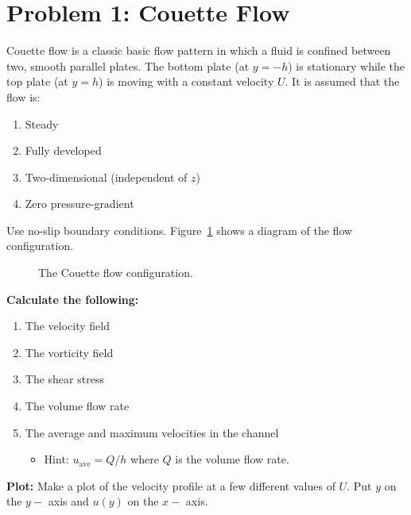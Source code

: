 \documentclass[11pt]{article}
\begin{document}
  \section{Problem 1:  Couette Flow}
    Couette flow is a classic basic flow pattern in which a fluid is confined between two, smooth parallel plates.  The
bottom plate (at $y=-h$) is stationary while the top plate (at $y=h$) is moving with a constant velocity $U$.  It is assumed
that the flow is:
    \begin{enumerate}
      \item Steady
      \item Fully developed
      \item Two-dimensional (independent of $z$)
      \item Zero pressure-gradient
    \end{enumerate}
    Use no-slip boundary conditions.  Figure~\ref{fig:couette} shows a diagram of the flow configuration.
    \begin{figure}[h!]
      \centering
      \caption{The Couette flow configuration.}
      \label{fig:couette}
    \end{figure}

    \textbf{Calculate the following:}
    \begin{enumerate}
      \item The velocity field 
      \item The vorticity field
      \item The shear stress
      \item The volume flow rate 
      \item The average and maximum velocities in the channel
        \begin{itemize}
          \item Hint:  $u_{\textrm{ave}} = Q / h$ where $Q$ is the volume flow rate.
        \end{itemize}
    \end{enumerate}

    \textbf{Plot:}
    Make a plot of the velocity profile at a few different values of $U$.  Put $y$ on the $y-$ axis and $u\left(y\right)$ on
the $x-$ axis.
\end{document}
